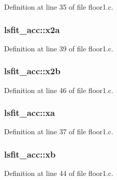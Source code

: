 Definition at line 35 of file floor1.\+c.

\subsubsection[{\texorpdfstring{x2a}{x2a}}]{ lsfit\+\_\+acc\+::x2a}\hypertarget{structlsfit__acc_a14c369e28b59a48a2a3c70c80ab3bce3}{}\label{structlsfit__acc_a14c369e28b59a48a2a3c70c80ab3bce3}


Definition at line 39 of file floor1.\+c.

\subsubsection[{\texorpdfstring{x2b}{x2b}}]{ lsfit\+\_\+acc\+::x2b}\hypertarget{structlsfit__acc_aefa3b90f474ae621805595d2a89ef2f0}{}\label{structlsfit__acc_aefa3b90f474ae621805595d2a89ef2f0}


Definition at line 46 of file floor1.\+c.

\subsubsection[{\texorpdfstring{xa}{xa}}]{ lsfit\+\_\+acc\+::xa}\hypertarget{structlsfit__acc_aca2a73c1ac7e72c7a256e6128a7fdc0f}{}\label{structlsfit__acc_aca2a73c1ac7e72c7a256e6128a7fdc0f}


Definition at line 37 of file floor1.\+c.

\subsubsection[{\texorpdfstring{xb}{xb}}]{ lsfit\+\_\+acc\+::xb}\hypertarget{structlsfit__acc_a63109c854fc23e51337513344e3c1266}{}\label{structlsfit__acc_a63109c854fc23e51337513344e3c1266}


Definition at line 44 of file floor1.\+c.

